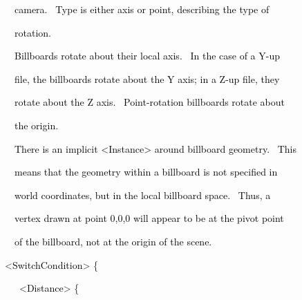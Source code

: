 \documentclass[a4paper]{article}
\newcommand\textstyleOOoComputerKeyWord[1]{\textrm{\textcolor[rgb]{0.0,0.0,0.5019608}{#1}}}
\newcommand\textstyleOOoAssemblerSpecialChar[1]{\textrm{\textcolor[rgb]{0.0,0.5019608,0.0}{#1}}}
\newcommand\textstyleOOoAssemblerIdent[1]{\textrm{\textcolor{black}{#1}}}
\begin{document}
{\color{black}
\textstyleOOoComputerKeyWord{\textcolor{black}{\ \ \ \ camera. \ Type is either {\textquotedbl}axis{\textquotedbl} or
{\textquotedbl}point{\textquotedbl}, describing the type of}}}

{\color{black}
\textstyleOOoComputerKeyWord{\textcolor{black}{\ \ \ \ rotation.}}}


\bigskip

{\color{black}
\textstyleOOoComputerKeyWord{\textcolor{black}{\ \ \ \ Billboards rotate about their local axis. \ In the case of a
Y-up}}}

{\color{black}
\textstyleOOoComputerKeyWord{\textcolor{black}{\ \ \ \ file, the billboards rotate about the Y axis; in a Z-up file,
they}}}

{\color{black}
\textstyleOOoComputerKeyWord{\textcolor{black}{\ \ \ \ rotate about the Z axis. \ Point-rotation billboards rotate
about}}}

{\color{black}
\textstyleOOoComputerKeyWord{\textcolor{black}{\ \ \ \ the origin.}}}


\bigskip

{\color{black}
\textstyleOOoComputerKeyWord{\textcolor{black}{\ \ \ \ There is an implicit {\textless}Instance{\textgreater} around
billboard geometry. \ This}}}

{\color{black}
\textstyleOOoComputerKeyWord{\textcolor{black}{\ \ \ \ means that the geometry within a billboard is not specified in}}}

{\color{black}
\textstyleOOoComputerKeyWord{\textcolor{black}{\ \ \ \ world coordinates, but in the local billboard space. \ Thus, a}}}

{\color{black}
\textstyleOOoComputerKeyWord{\textcolor{black}{\ \ \ \ vertex drawn at point 0,0,0 will appear to be at the pivot
point}}}

{\color{black}
\textstyleOOoComputerKeyWord{\textcolor{black}{\ \ \ \ of the billboard, not at the origin of the scene.}}}


\bigskip

{\color{black}
\textstyleOOoComputerKeyWord{\textcolor{black}{\ \ }}\textstyleOOoAssemblerSpecialChar{{\textless}}\textstyleOOoAssemblerIdent{SwitchCondition}\textstyleOOoAssemblerSpecialChar{{\textgreater}}\textstyleOOoComputerKeyWord{\textcolor{black}{
}}\textstyleOOoAssemblerSpecialChar{\{}}

{\color{black}
\textstyleOOoComputerKeyWord{\textcolor{black}{\ \ \ \ \ }}\textstyleOOoAssemblerSpecialChar{{\textless}}\textstyleOOoAssemblerIdent{Distance}\textstyleOOoAssemblerSpecialChar{{\textgreater}}\textstyleOOoComputerKeyWord{\textcolor{black}{
}}\textstyleOOoAssemblerSpecialChar{\{}\textstyleOOoComputerKeyWord{\textcolor{black}{ }}}
\end{document}
